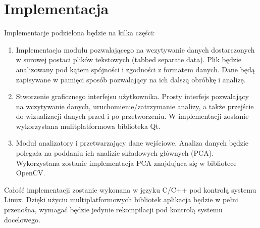 \documentclass[a4paper,12pt]{article}
\begin{document}
%

\section{Implementacja}

Implementacje podzielona będzie na kilka części:

\begin{enumerate}
\item Implementacja modułu pozwalającego na wczytywanie danych dostarczonych w surowej postaci plików tekstowych (tabbed separate data). Plik będzie analizowany pod kątem spójności i zgodności z formatem danych. Dane będą zapisywane w pamięci sposób pozwalający na ich dalszą obróbkę i analizę.
\item Stworzenie graficznego interfejsu użytkownika. Prosty interfejs pozwalający na wczytywanie danych, uruchomienie/zatrzymanie analizy, a także przejście do wizualizacji danych przed i po przetworzeniu. W implementacji zostanie wykorzystana mulitplatformowa biblioteka Qt.
\item Moduł analizatory i przetwarzający dane wejściowe. Analiza danych będzie polegała na poddaniu ich analizie składowych głównych (PCA). Wykorzystana zostanie implementacja PCA znajdująca się w bibliotece OpenCV.
\end{enumerate}

Całość implementacji zostanie wykonana w języku C/C++ pod kontrolą systemu Linux. Dzięki użyciu multiplatformowych bibliotek aplikacja będzie w pełni przenośna, wymagać będzie jedynie rekompilacji pod kontrolą systemu docelowego.
%
\end{document}
